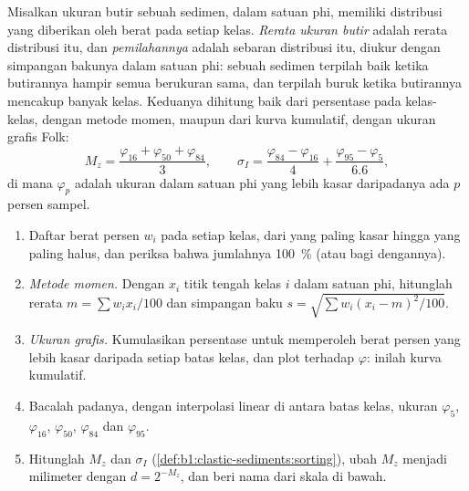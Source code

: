 \begin{definition}\label{def:b1:clastic-sediments:sorting}
Misalkan ukuran butir sebuah sedimen, dalam satuan phi, memiliki distribusi yang diberikan oleh berat pada setiap kelas. \emph{Rerata ukuran butir} adalah rerata distribusi itu, dan \emph{pemilahannya} adalah sebaran distribusi itu, diukur dengan simpangan bakunya dalam satuan phi: sebuah sedimen terpilah baik ketika butirannya hampir semua berukuran sama, dan terpilah buruk ketika butirannya mencakup banyak kelas. Keduanya dihitung baik dari persentase pada kelas-kelas, dengan metode momen, maupun dari kurva kumulatif, dengan ukuran grafis Folk:
\[
  M_z = \frac{\varphi_{16} + \varphi_{50} + \varphi_{84}}{3}, \qquad
  \sigma_I = \frac{\varphi_{84} - \varphi_{16}}{4} + \frac{\varphi_{95} - \varphi_{5}}{6.6},
\]
di mana $\varphi_p$ adalah ukuran dalam satuan phi yang lebih kasar daripadanya ada $p$ persen sampel.
\end{definition}

\begin{method}\label{met:b1:clastic-sediments:graphic}
\begin{enumerate}
  \item Daftar berat persen $w_i$ pada setiap kelas, dari yang paling kasar hingga yang paling halus, dan periksa bahwa jumlahnya \qty{100}{\percent} (atau bagi dengannya).
  \item \emph{Metode momen.} Dengan $x_i$ titik tengah kelas $i$ dalam satuan phi, hitunglah rerata $m = \sum w_i x_i / 100$ dan simpangan baku $s = \sqrt{\sum w_i (x_i - m)^2 / 100}$.
  \item \emph{Ukuran grafis.} Kumulasikan persentase untuk memperoleh berat persen yang lebih kasar daripada setiap batas kelas, dan plot terhadap $\varphi$: inilah kurva kumulatif.
  \item Bacalah padanya, dengan interpolasi linear di antara batas kelas, ukuran $\varphi_5$, $\varphi_{16}$, $\varphi_{50}$, $\varphi_{84}$ dan $\varphi_{95}$.
  \item Hitunglah $M_z$ dan $\sigma_I$ (\cref{def:b1:clastic-sediments:sorting}), ubah $M_z$ menjadi milimeter dengan $d = 2^{-M_z}$, dan beri nama  dari skala di bawah.
\end{enumerate}
\end{method}

